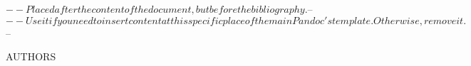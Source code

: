 $-- Placed after the content of the document, but before the bibliography.
$-- %
$-- Use it if you need to insert content at this specific place of the main Pandoc's template. Otherwise, remove it.
$-- %

AUTHORS